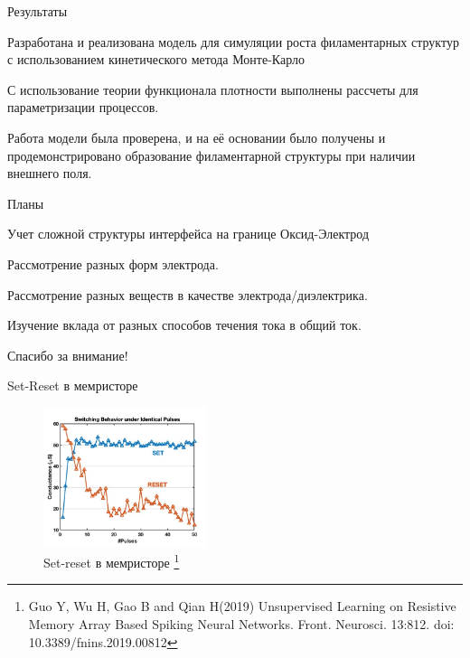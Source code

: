 \documentclass{beamer}%
\begin{document}
\begin{frame}{Результаты}

\begin{list}{*}{}
    \item  Разработана и реализована модель для симуляции роста филаментарных структур с использованием кинетического метода Монте-Карло
    \item  С использование теории функционала плотности выполнены рассчеты для параметризации процессов.
    \item  Работа модели была проверена, и на её основании было получены и продемонстрировано образование филаментарной структуры при наличии внешнего поля.
\end{list}
\end{frame}
\begin{frame}{Планы}

\begin{list}{*}{}
    \item  Учет сложной структуры интерфейса на границе Оксид-Электрод
    \item  Рассмотрение разных форм электрода.
    \item  Рассмотрение разных веществ в качестве электрода/диэлектрика.
    \item  Изучение вклада от разных способов течения тока в общий ток.
\end{list}



\end{frame}

\begin{frame}[plain]
\vfill
\centerline{Спасибо за внимание!}
\vfill\vfill
\end{frame}

\begin{frame}{Set-Reset в мемристоре}
    \begin{figure}
        \centering
        \includegraphics[width=180px]{img/memristor-set-reset.jpg}
        \caption{Set-reset в мемристоре%
    \footnote{%
    Guo Y, Wu H, Gao B and Qian H(2019) Unsupervised Learning on Resistive Memory Array Based Spiking Neural Networks. Front. Neurosci. 13:812. doi: 10.3389/fnins.2019.00812
    }%
  }
    \end{figure}
\end{frame}
\end{document}
